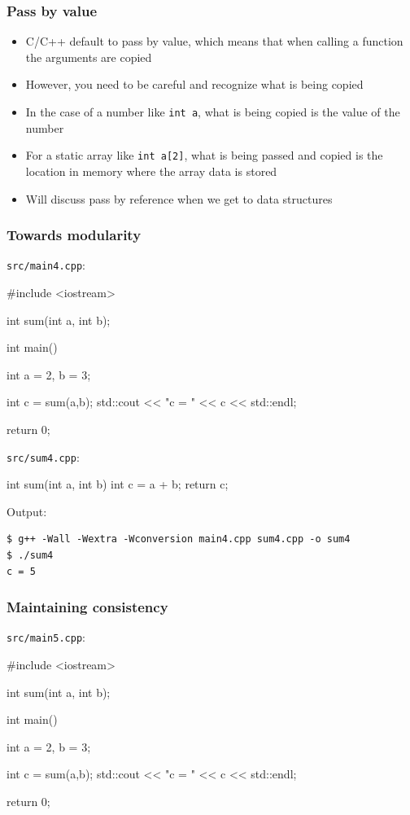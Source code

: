 \documentclass[12pt,letterpaper,twoside]{article}
\begin{document}
\subsubsection{Pass by value}
\begin{itemize}
\item
  C/C++ default to pass by value, which means that when calling a
  function the arguments are copied
\item
  However, you need to be careful and recognize what is being copied
\item
  In the case of a number like \texttt{int\ a}, what is being copied is
  the value of the number
\item
  For a static array like \texttt{int\ a{[}2{]}}, what is being passed
  and copied is the location in memory where the array data is stored
\item
  Will discuss pass by reference when we get to data structures
\end{itemize}

\subsubsection{Towards modularity}
\texttt{src/main4.cpp}:

\begin{cpp}
#include <iostream>

int sum(int a, int b);

int main() {
  int a = 2, b = 3;

  int c = sum(a,b);
  std::cout << "c = " << c << std::endl;

  return 0;
}
\end{cpp}

\texttt{src/sum4.cpp}:

\begin{cpp}
int sum(int a, int b) {
  int c = a + b;
  return c;
}
\end{cpp}

Output:

\begin{verbatim}
$ g++ -Wall -Wextra -Wconversion main4.cpp sum4.cpp -o sum4
$ ./sum4
c = 5
\end{verbatim}

\subsubsection{Maintaining consistency}
\texttt{src/main5.cpp}:

\begin{cpp}
#include <iostream>

int sum(int a, int b);

int main() {
  int a = 2, b = 3;

  int c = sum(a,b);
  std::cout << "c = " << c << std::endl;

  return 0;
}
\end{cpp}
\end{document}
